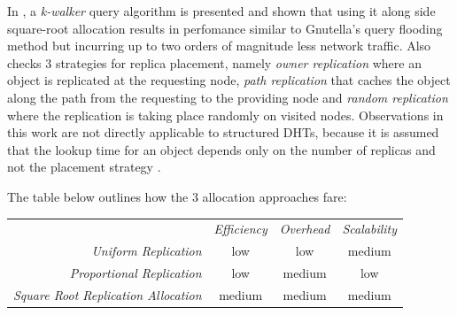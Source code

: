 In \cite{LCCLS2002}, a \emph{k-walker} query algorithm is presented and shown
that using it along side square-root allocation results in perfomance similar to
Gnutella's query flooding method but incurring up to two
orders of magnitude less network traffic. Also checks $3$ strategies for
replica placement, namely \emph{owner replication} where an object is replicated
at the requesting node, \emph{path replication} that caches the object along the
path from the requesting to the providing node and \emph{random replication}
where the replication is taking place randomly on visited nodes. Observations in
this work are not directly applicable to structured DHTs, because it is assumed
that the lookup time for an object depends only on the number of replicas and
not the placement strategy \cite{RS2004}.


The table below outlines how the $3$ allocation approaches fare:
\begin{center}
{\footnotesize
\begin{tabular}{rccc}
\multicolumn{1}{r}{} &
\multicolumn{1}{c}{\emph{Efficiency}} &
\multicolumn{1}{c}{\emph{Overhead}} &
\multicolumn{1}{c}{\emph{Scalability}}
\\
\cline{2-4}
\emph{Uniform Replication} &
low &
low &
%
medium \\
\emph{Proportional Replication} &
low &
medium &
%
low \\
\emph{Square Root Replication Allocation} &
medium &
medium &
medium \\
\end{tabular}
}
\end{center}

